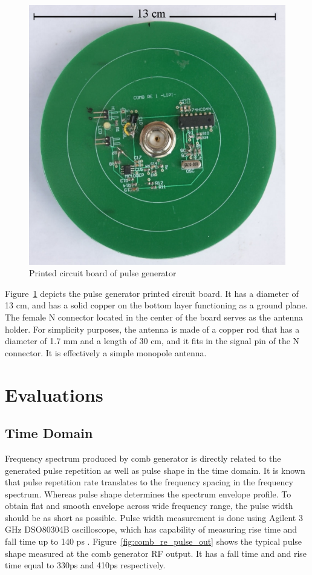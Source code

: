 \documentclass{pj}
\begin{document}
\begin{figure}[h]
	\centerline{\includegraphics[width=0.55\columnwidth,draft=false]{board_comb_re.pdf}}
	\caption{Printed circuit board of pulse generator}
	\label{fig:board_comb_re}
\end{figure}

Figure~\ref{fig:board_comb_re} depicts the pulse generator printed circuit board. It has a diameter of 13 cm, and has a solid copper on the bottom layer functioning as a ground plane. The female N connector located in the center of the board serves as the antenna holder. For simplicity purposes, the antenna is made of a copper rod that has a diameter of 1.7 mm and a length of 30 cm, and it fits in the signal pin of the N connector. It is effectively a simple monopole antenna. 


\section{Evaluations}


\subsection{Time Domain}

Frequency spectrum produced by comb generator is directly related to the generated pulse repetition as well as pulse shape in the time domain. It is known that pulse repetition rate translates to the frequency spacing in the frequency spectrum. Whereas pulse shape determines the spectrum envelope profile. To obtain flat and smooth envelope across wide frequency range, the pulse width should be as short as possible. Pulse width measurement is done using Agilent 3 GHz DSO80304B oscilloscope, which has capability of measuring rise time and fall time up to 140 ps \cite{agilent_dso80000}. Figure~\ref{fig:comb_re_pulse_out} shows the typical pulse shape measured at the comb generator RF output. It has a fall time and  and rise time equal to 330ps and 410ps respectively.
\end{document}
